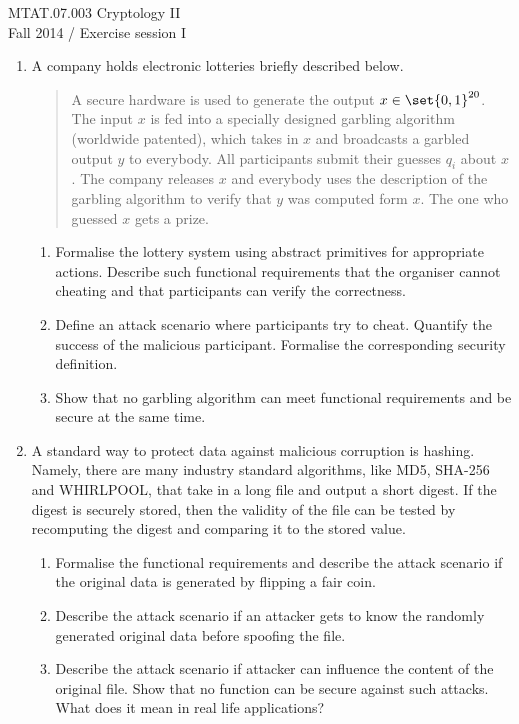 \documentclass{article}
\begin{document}
\noindent	
MTAT.07.003 Cryptology II\\
Fall 2014 / Exercise session I  

\begin{enumerate}

\item A company holds electronic lotteries briefly described below.
  \begin{quote}
    A secure hardware is used to generate the output
    $x\in\set{0,1}^{20}$.  The input $x$ is fed into a specially
    designed garbling algorithm (worldwide patented), which takes in
    $x$ and broadcasts a garbled output $y$ to everybody.  All
    participants submit their guesses $q_i$ about $x$. The company
    releases $x$ and everybody uses the description of the garbling
    algorithm to verify that $y$ was computed form $x$. The one who
    guessed $x$ gets a prize.
  \end{quote}

  \begin{enumerate}
  \item Formalise the lottery system using abstract primitives for
    appropriate actions. Describe such functional requirements that
    the organiser cannot cheating and that participants can verify the
    correctness.
  \item Define an attack scenario where participants try to
    cheat. Quantify the success of the malicious
    participant. Formalise the corresponding security definition.
  \item Show that no garbling algorithm can meet functional
    requirements and be secure at the same time.
  \end{enumerate}
 
\item A standard way to protect data against malicious corruption is
  hashing. Namely, there are many industry standard algorithms, like
  MD5, SHA-256 and WHIRLPOOL, that take in a long file and output a
  short digest. If the digest is securely stored, then the validity of
  the file can be tested by recomputing the digest and comparing it to
  the stored value.
  \begin{enumerate}
  \item Formalise the functional requirements and describe the attack
    scenario if the original data is generated by flipping a fair coin.
  \item Describe the attack scenario if an attacker gets to know the
    randomly generated original data before spoofing the file. 
  \item Describe the attack scenario if attacker can influence the
    content of the original file. Show that no function can be secure
    against such attacks. What does it mean in real life applications?
  \end{enumerate}


\end{enumerate}
\end{document}
